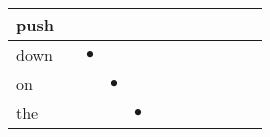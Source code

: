 \documentclass[landscape]{article}
\newcommand{\ssp}{\hspace{2pt}}
\newcommand{\mex}{\cellcolor{g}$\bullet$}
\begin{document}
\begin{tabular}{|l|p{10pt}|p{10pt}|p{10pt}|p{10pt}|p{10pt}|p{10pt}|p{10pt}|p{10pt}|p{10pt}|p{10pt}|p{10pt}|}
\hline
\ssp push \ssp&\hspace{2pt}&\hspace{2pt}&\hspace{2pt}&\hspace{2pt}&\hspace{2pt}&\hspace{2pt}&\hspace{2pt}&\hspace{2pt}&\hspace{2pt}&\hspace{2pt}&\hspace{2pt}\\
\hline
\ssp \cellcolor{ref1}down \ssp&\hspace{2pt}&\hspace{2pt}\mex&\hspace{2pt}&\hspace{2pt}&\hspace{2pt}&\hspace{2pt}&\hspace{2pt}&\hspace{2pt}&\hspace{2pt}&\hspace{2pt}&\hspace{2pt}\\
\hline
\ssp \cellcolor{ref2}on \ssp&\hspace{2pt}&\hspace{2pt}&\hspace{2pt}\mex&\hspace{2pt}&\hspace{2pt}&\hspace{2pt}&\hspace{2pt}&\hspace{2pt}&\hspace{2pt}&\hspace{2pt}&\hspace{2pt}\\
\hline
\ssp \cellcolor{ref3}the \ssp&\hspace{2pt}&\hspace{2pt}&\hspace{2pt}&\hspace{2pt}\mex&\hspace{2pt}&\hspace{2pt}&\hspace{2pt}&\hspace{2pt}&\hspace{2pt}&\hspace{2pt}&\hspace{2pt}\\

\end{tabular}
\end{document}
